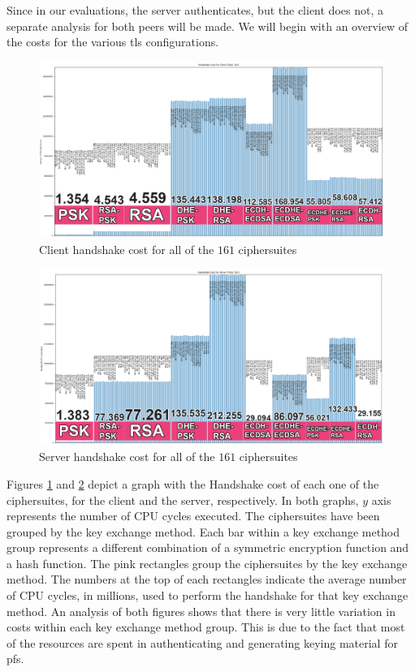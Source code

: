\documentclass{llncs}
\begin{document}
Since in our evaluations, the server authenticates, but the client does not,
a separate analysis for both peers will be made. We will begin with an overview of the costs for the various \gls{tls}
configurations.

\begin{figure}
  \centering
  \includegraphics[width=1.0\textwidth]{img/hs_cost_cli.png}
  \centering \caption{\label{fig:hs-all-ciphers-cli} Client handshake cost for all of the $161$ ciphersuites}
\end{figure}

\begin{figure}
  \centering
  \includegraphics[width=1.0\textwidth]{img/hs_cost_srv.png}
  \centering \caption{\label{fig:hs-all-ciphers-srv} Server handshake cost for all of the $161$ ciphersuites}
\end{figure}

Figures \ref{fig:hs-all-ciphers-cli} and \ref{fig:hs-all-ciphers-srv} depict a graph with the Handshake cost of each one
of the ciphersuites, for the client and the server, respectively. In both graphs, $y$ axis represents the number of
CPU cycles executed. The ciphersuites have been grouped by the key exchange method. Each bar within a key
exchange method group represents a different combination of a symmetric encryption function and a hash function.
The pink rectangles group the ciphersuites by the key exchange method. The numbers at the top of each rectangles indicate the average
number of CPU  cycles, in millions, used to perform the handshake for that key exchange method.
An analysis of both figures shows that there is very little variation in costs within
each key exchange method group. This is due to the fact that most of the resources are spent in authenticating and
generating keying material for \gls{pfs}.
\end{document}
